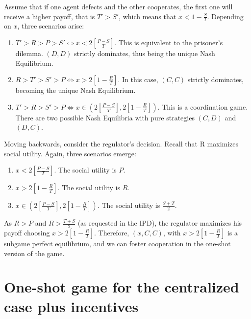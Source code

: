     Assume that if one agent defects and the other cooperates, the first one will receive a higher payoff, that is $T' > S'$, which means that $x < 1 - \frac{S}{T}$. Depending on $x$, three scenarios arise:
    \begin{enumerate}
        \item $T' > R > P > S' \iff x < 2 \left[ \frac{P-S}{T}\right]$. This is
        equivalent to the prisoner's dilemma. $(D,D)$ strictly dominates, thus being the unique Nash Equilibrium. 
        
        \item $R > T' > S' > P \iff x > 2 \left[ 1- \frac{R}{T}\right]$. In this case, $(C,C)$ strictly dominates, becoming the unique Nash Equilibrium. 
        
        \item $T' > R > S' > P \iff x \in \left( 2 \left[ \frac{P-S}{T}\right], 2 \left[ 1- \frac{R}{T}\right] \right) $. This is a coordination game. There are two possible Nash Equilibria with pure strategies $(C, D)$ and $(D, C)$.
    \end{enumerate}
    
    Moving backwards, consider the regulator's decision. Recall that
    R maximizes social utility. Again, three scenarios emerge:
   \begin{enumerate}
        \item $x < 2 \left[ \frac{P-S}{T}\right]$. The social utility is $P$.
        
        \item $x > 2 \left[ 1- \frac{R}{T}\right]$. The social utility is $R$.
        
        \item $x \in \left( 2 \left[ \frac{P-S}{T}\right], 2 \left[ 1- \frac{R}{T}\right] \right) $. The social utility is $\frac{S+T}{2}$.
    \end{enumerate}
    
    As $R > P$ and $R > \frac{T+S}{2}$ (as requested in the IPD),
    the regulator maximizes his payoff choosing $x > 2 \left[ 1- \frac{R}{T}\right]$. Therefore, $(x, C, C)$, with $x > 2 \left[ 1- \frac{R}{T}\right]$ is a subgame perfect equilibrium, and 
    we can foster cooperation in the one-shot version of the game.
    
\section{One-shot game for the centralized case plus incentives}\label{sec:oneshot_inc}

